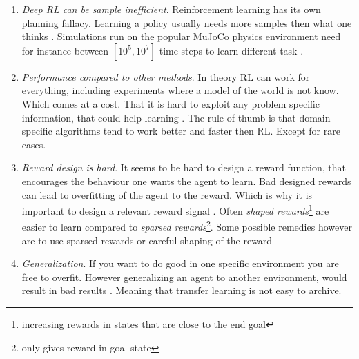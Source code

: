 \documentclass{kththesis}
\theoremstyle{definition}
\begin{document}
\begin{enumerate}
    \item \textit{Deep RL can be sample inefficient}. Reinforcement learning has its own planning fallacy. Learning a policy usually needs more samples then what one thinks \parencite{irpan_2018}. Simulations run on the popular MuJoCo physics environment need for instance between $[10^5, 10^7]$ time-steps to learn different task \parencite{heess2017emergence}.
    
    \item \textit{Performance compared to other methods}. In theory RL can work for everything, including experiments where a model of the world is not know. Which comes at a cost. That it is hard to exploit any problem specific information, that could help learning \parencite{irpan_2018}. The rule-of-thumb is that domain-specific algorithms tend to work better and faster then RL. Except for rare cases.
    
    \item \textit{Reward design is hard}. It seems to be hard to design a reward function, that encourages the behaviour one wants the agent to learn. Bad designed rewards can lead to overfitting of the agent to the reward. Which is why it is important to design a relevant reward signal \parencite{sutton1998reinforcement, irpan_2018}. Often \textit{shaped rewards}\footnote{increasing rewards in states that are close to the end goal} are easier to learn compared to \textit{sparsed rewards}\footnote{only gives reward in goal state}. Some possible remedies however are to use sparsed rewards or careful shaping of the reward \parencite{irpan_2018}
    
    \item \textit{Generalization}. If you want to do good in one specific environment you are free to overfit. However generalizing an agent to another environment, would result in bad results \parencite{irpan_2018}. Meaning that transfer learning is not easy to archive. 
    
\end{enumerate}


\end{document}

